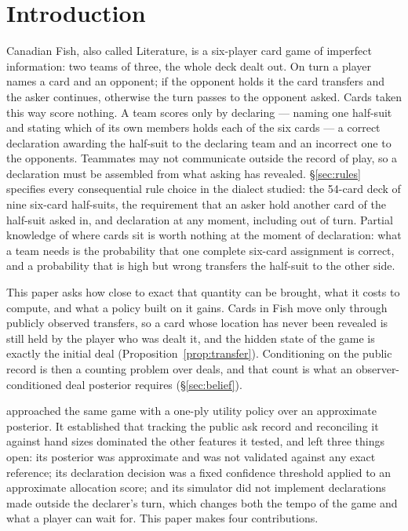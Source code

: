 \section{Introduction}

Canadian Fish, also called Literature, is a six-player card game of imperfect
information: two teams of three, the whole deck dealt out. On turn a player names
a card and an opponent; if the opponent holds it the card transfers and the
asker continues, otherwise the turn passes to the opponent asked. Cards taken
this way score nothing. A team scores only by declaring --- naming one half-suit
and stating which of its own members holds each of the six cards --- a correct
declaration awarding the half-suit to the declaring team and an incorrect one to
the opponents. Teammates may not communicate outside the record of play, so a
declaration must be assembled from what asking has revealed. \S\ref{sec:rules}
specifies every consequential rule choice in the dialect studied: the 54-card
deck of nine six-card half-suits, the requirement that an asker hold another card
of the half-suit asked in, and declaration at any moment, including out of turn.
Partial knowledge of where cards sit is worth nothing at the moment of
declaration: what a team needs is the probability that one complete six-card
assignment is correct, and a probability that is high but wrong transfers the
half-suit to the other side.

This paper asks how close to exact that quantity can be brought, what it costs to
compute, and what a policy built on it gains. Cards in Fish move only through
publicly observed transfers, so a card whose location has never been revealed is
still held by the player who was dealt it, and the hidden state of the game is
exactly the initial deal (Proposition~\ref{prop:transfer}). Conditioning on the
public record is then a counting problem over deals, and that count is what an
observer-conditioned deal posterior requires (\S\ref{sec:belief}).

\vthree{} \cite{fishbot03} approached the same game with a one-ply utility policy
over an approximate posterior. It established that tracking the public ask record
and reconciling it against hand sizes dominated the other features it tested, and
left three things open: its posterior was approximate and was not validated
against any exact reference; its declaration decision was a fixed confidence
threshold applied to an approximate allocation score; and its simulator did not
implement declarations made outside the declarer's turn, which changes both the
tempo of the game and what a player can wait for. This paper makes four
contributions.

